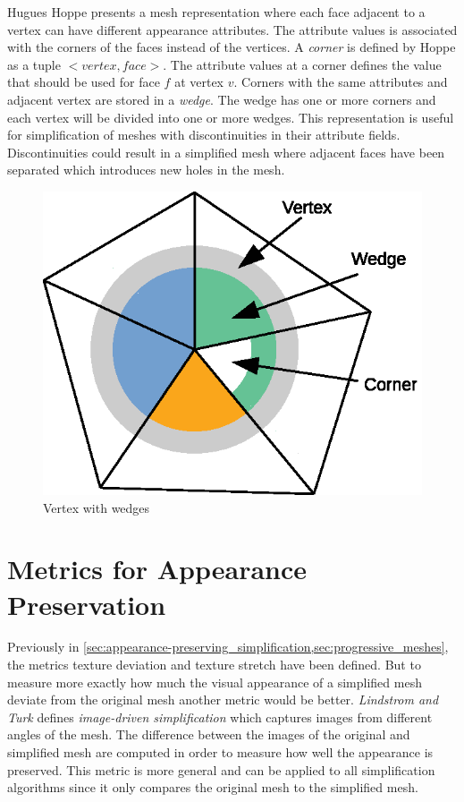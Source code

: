 Hugues Hoppe \cite{hoppe1998efficient} presents a mesh representation where each face adjacent to a vertex can have different appearance attributes. The attribute values is associated with the corners of the faces instead of the vertices. A \emph{corner} is defined by Hoppe as a tuple $<vertex,face>$. The attribute values at a corner defines the value that should be used for face $f$ at vertex $v$. Corners with the same attributes and adjacent vertex are stored in a \emph{wedge}. The wedge has one or more corners and each vertex will be divided into one or more wedges. This representation is useful for simplification of meshes with discontinuities in their attribute fields. Discontinuities could result in a simplified mesh where adjacent faces have been separated which introduces new holes in the mesh.

\begin{figure}[ht]
    \centering
    \includegraphics[width=.49\textwidth]{figures/wedge.eps}
    \caption{Vertex with wedges}
    \label{fig:wedge}
\end{figure}

\section{Metrics for Appearance Preservation} \label{sec:metrics_for_appearance_preservation}
Previously in \cref{sec:appearance-preserving_simplification,sec:progressive_meshes}, the metrics texture deviation and texture stretch have been defined. But to measure more exactly how much the visual appearance of a simplified mesh deviate from the original mesh another metric would be better. \emph{Lindstrom and Turk} \cite{lindstrom2000image} defines \emph{image-driven simplification} which captures images from different angles of the mesh. The difference between the images of the original and simplified mesh are computed in order to measure how well the appearance is preserved. This metric is more general and can be applied to all simplification algorithms since it only compares the original mesh to the simplified mesh.

